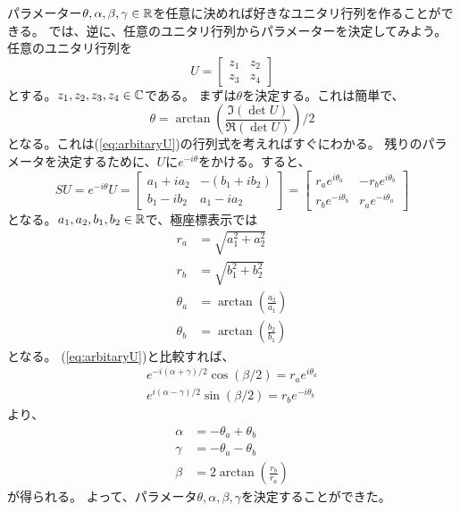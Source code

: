 パラメーター$\theta,\alpha,\beta,\gamma\in\mathbb{R}$を任意に決めれば好きなユニタリ行列を作ることができる。
では、逆に、任意のユニタリ行列からパラメーターを決定してみよう。
任意のユニタリ行列を
\begin{equation}
  U =
  \begin{bmatrix}
    z_1 & z_2 \\
    z_3 & z_4
  \end{bmatrix}
\end{equation}
とする。$z_1,z_2,z_3,z_4\in\mathbb{C}$である。
まずは$\theta$を決定する。これは簡単で、
\begin{equation}
  \theta = \arctan\left(\frac{\Im(\det U)}{\Re(\det U)}\right)/2
\end{equation}
となる。これは(\ref{eq:arbitaryU})の行列式を考えればすぐにわかる。
残りのパラメータを決定するために、$U$に$e^{-i\theta}$をかける。すると、
\begin{equation}
  SU = e^{-i\theta}U =
  \begin{bmatrix}
    a_1 + ia_2 & -(b_1 + ib_2) \\
    b_1 - ib_2 & a_1 - ia_2
  \end{bmatrix}
  =
  \begin{bmatrix}
    r_a e^{i\theta_a} & -r_b e^{i\theta_b} \\
    r_b e^{-i\theta_b} & r_a e^{-i\theta_a}
  \end{bmatrix}
\end{equation}
となる。$a_1,a_2,b_1,b_2\in\mathbb{R}$で、極座標表示では
\begin{align}
  r_a      &= \sqrt{a_1^2 + a_2^2} \\
  r_b      &= \sqrt{b_1^2 + b_2^2} \\
  \theta_a &= \arctan\left(\frac{a_2}{a_1}\right) \\
  \theta_b &= \arctan\left(\frac{b_2}{b_1}\right)
\end{align}
となる。
(\ref{eq:arbitaryU})と比較すれば、
\begin{align}
  e^{-i(\alpha+\gamma)/2}\cos(\beta/2) = r_a e^{i\theta_a} \\
  e^{i(\alpha-\gamma)/2}\sin(\beta/2)  = r_b e^{-i\theta_b}
\end{align}
より、
\begin{align}
  \alpha &= -\theta_a + \theta_b \\
  \gamma &= -\theta_a - \theta_b \\
  \beta  &= 2\arctan\left(\frac{r_b}{r_a}\right)
\end{align}
が得られる。
よって、パラメータ$\theta,\alpha,\beta,\gamma$を決定することができた。


